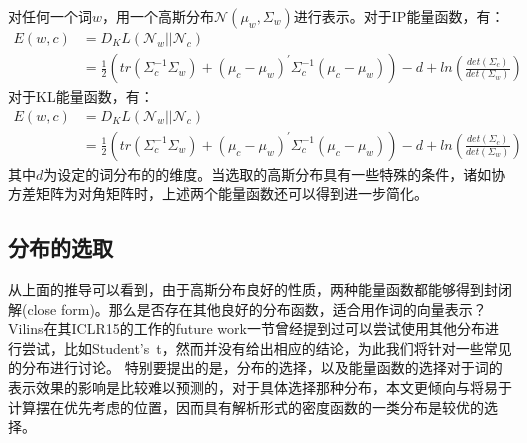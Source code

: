 \documentclass[a4paper,13pt]{article}
\begin{document}
\begin{spacing}{1.5}
对任何一个词$w$，用一个高斯分布$\mathcal{N}(\mu_w,\Sigma_w)$进行表示。对于IP能量函数，有：
\begin{align*}
E(w,c)&=D_KL(\mathcal{N}_w||\mathcal{N}_c)\\
&=\frac{1}{2}(tr(\Sigma_c^{-1}\Sigma_w)+(\mu_c-\mu_w)^{\prime{}}\Sigma_c^{-1}(\mu_c-\mu_w))-d+ln(\frac{det(\Sigma_c)}{det(\Sigma_w)})
\end{align*}
对于KL能量函数，有：
\begin{align*}
E(w,c)&=D_KL(\mathcal{N}_w||\mathcal{N}_c)\\
&=\frac{1}{2}(tr(\Sigma_c^{-1}\Sigma_w)+(\mu_c-\mu_w)^{\prime{}}\Sigma_c^{-1}(\mu_c-\mu_w))-d+ln(\frac{det(\Sigma_c)}{det(\Sigma_w)})
\end{align*}
其中$d$为设定的词分布的的维度。当选取的高斯分布具有一些特殊的条件，诸如协方差矩阵为对角矩阵时，上述两个能量函数还可以得到进一步简化。

\subsection{分布的选取}

从上面的推导可以看到，由于高斯分布良好的性质，两种能量函数都能够得到封闭解(close form)。那么是否存在其他良好的分布函数，适合用作词的向量表示？Vilins在其ICLR15的工作的future work一节曾经提到过可以尝试使用其他分布进行尝试，比如Student’s\ t，然而并没有给出相应的结论，为此我们将针对一些常见的分布进行讨论。
特别要提出的是，分布的选择，以及能量函数的选择对于词的表示效果的影响是比较难以预测的，对于具体选择那种分布，本文更倾向与将易于计算摆在优先考虑的位置，因而具有解析形式的密度函数的一类分布是较优的选择。


\end{spacing}
\end{document}
